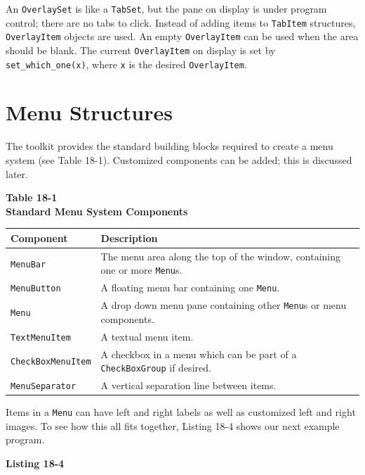 An \texttt{OverlaySet} is like a \texttt{TabSet},
but the pane on display is under program control; there are no
tabs to click. Instead of adding items to \texttt{TabItem} structures,
\texttt{OverlayItem} objects are used. An empty \texttt{OverlayItem} can be
used when the area should be blank. The current \texttt{OverlayItem} on
display is set by \texttt{set\_which\_one(x)}, where \texttt{x} is
the desired \texttt{OverlayItem}.

\section{Menu Structures}

The toolkit provides the standard building blocks required to create
a menu system (see Table 18-1). Customized components can
be added; this is discussed later.

\begin{center}
{\centering\sffamily\bfseries
Table 18-1 \\
Standard Menu System Components}
\end{center}
\begin{flushleft}
\begin{supertabular}{|m{1.6in}|m{4.3in}|}
\hline
\sffamily\bfseries Component &
\sffamily\bfseries Description\\\hline
\texttt{MenuBar} &
The menu area along the top of the window, containing one or
more \texttt{Menu}s.\\\hline
\texttt{MenuButton} &
A floating menu bar containing one \texttt{Menu}.\\\hline
\texttt{Menu} &
A drop down menu pane containing other \texttt{Menu}s or menu
components.\\\hline
\texttt{TextMenuItem} &
A textual menu item.\\\hline
\ttfamily \texttt{CheckBoxMenuItem}  &
A checkbox in a menu which can be part of a \texttt{CheckBoxGroup} if
desired.\\\hline
\texttt{MenuSeparator} &
A vertical separation line between items.\\\hline
\end{supertabular}
\end{flushleft}
Items in a \texttt{Menu} can have left and right labels as well as
customized left and right images. To see how this all fits together,
Listing 18-4 shows our next example program.

\bigskip

{\sffamily\bfseries
Listing 18-4}

